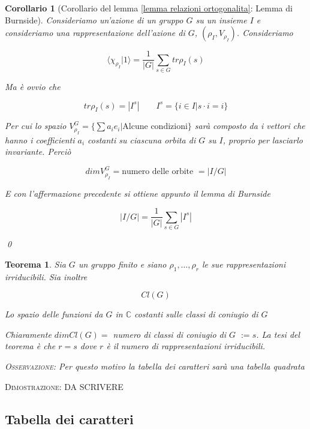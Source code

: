 \documentclass[11pt]{article}
\theoremstyle{plain}
\newtheorem{thm}{Teorema}[section]
\newtheorem*{cor}{Corollario}
\theoremstyle{definition}
\theoremstyle{remark}
\newcommand{\C}{\mathbb{C}}
\newcommand{\dsum}{\displaystyle\sum}
\begin{document}
\begin{cor}[Corollario del lemma \ref{lemma relazioni ortogonalita}: Lemma di Burnside]

Consideriamo un'azione di un gruppo $G$ su un insieme $I$ e consideriamo una rappresentazione dell'azione di $G$, $(\rho_I, V_{\rho_I})$. Consideriamo

\[\langle \chi_{\rho_I} | 1 \rangle = \dfrac{1}{|G|} \dsum_{s\in G} tr \rho_I(s)\]

Ma è ovvio che 

\[tr \rho_I(s) = |I^s| \qquad I^s = \{ i \in I | s \cdot i = i\} \]

Per cui lo spazio $V_{\rho_I}^G = \{\dsum a_i e_i | \text{Alcune condizioni}\}$ sarà composto da i vettori che hanno i coefficienti $a_i$ costanti su ciascuna orbita di $G$ su $I$, proprio per lasciarlo invariante. Perciò 

\[ dimV_{\rho_I}^G = \text{numero delle orbite } = |I/G|\]

E con l'affermazione precedente si ottiene appunto il lemma di Burnside

\[ |I/G| = \dfrac{1}{|G|} \dsum_{s\in G} |I^s|\]

\qed
\end{cor}



\begin{thm} Sia $G$ un gruppo finito e siano $\rho_1, \ldots , \rho_r$ le sue rappresentazioni irriducibili. Sia inoltre 

\[Cl(G)  \]

Lo spazio delle funzioni da $G$ in $\C$ costanti sulle classi di coniugio di $G$

Chiaramente $dimCl(G) = $ numero di classi di coniugio di $G$ $:= s$. La tesi del teorema è che $r = s$ dove $r$ è il numero di rappresentazioni irriducibili. 

\textsc{Osservazione:} Per questo motivo la tabella dei caratteri sarà una tabella quadrata

\end{thm}

\textsc{Dimostrazione:}
 DA SCRIVERE


















\subsection{Tabella dei caratteri}
\end{document}
